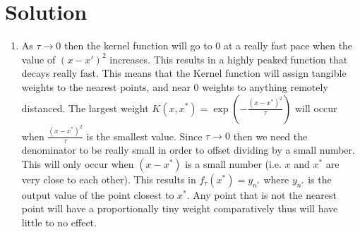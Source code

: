 \documentclass[submit]{harvardml}
\newenvironment{solution}
  {\color{blue}\section*{Solution}}
{}
\begin{document}
\begin{solution}
\begin{enumerate}
\begin{enumerate}
        \item As $\tau \rightarrow 0$ then the kernel function will go to 0 at a really fast pace when the value of $(x-x')^2$ increases. This results in a highly peaked function that decays really fast. This means that the Kernel function will assign tangible weights to the nearest points, and near 0 weights to anything remotely distanced. The largest weight $K(x,x^*)= \exp (-\frac{(x-x^*)^2}{\tau})$ will occur when $\frac{(x-x^*)^2}{\tau}$ is the smallest value. Since $\tau \rightarrow 0$ then we need the denominator to be really small in order to offset dividing by a small number. This will only occur when $(x-x^*)$ is a small number (i.e. $x$ and $x^*$ are very close to each other). This results in $f_{\tau}(x^*) = y_{n^*}$ where $y_{n^*}$ is the output value of the point closest to $x^*$. Any point that is not the nearest point will have a proportionally tiny weight comparatively thus will have little to no effect.
        
    \end{enumerate}
\end{enumerate}

\end{solution}
\end{document}
